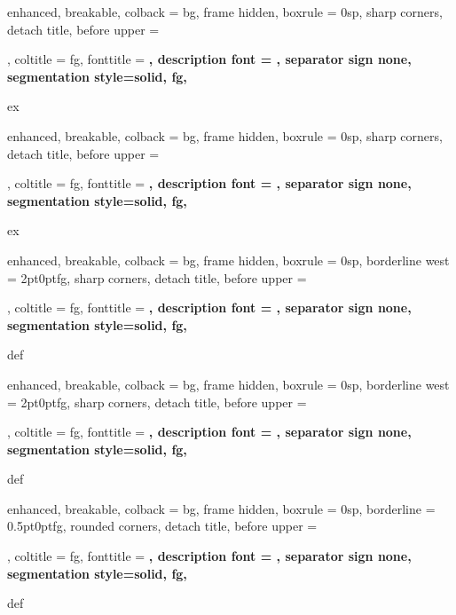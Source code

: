 {%
	enhanced,
	breakable,
	colback = bg,
	frame hidden,
	boxrule = 0sp,
	sharp corners,
	detach title,
	before upper = \tcbtitle\par\smallskip,
	coltitle = fg,
	fonttitle = \bfseries\sffamily,
	description font = \mdseries,
	separator sign none,
	segmentation style={solid, fg},
}
{ex}
{%
	enhanced,
	breakable,
	colback = bg,
	frame hidden,
	boxrule = 0sp,
	sharp corners,
	detach title,
	before upper = \tcbtitle\par\smallskip,
	coltitle = fg,
	fonttitle = \bfseries\sffamily,
	description font = \mdseries,
	separator sign none,
	segmentation style={solid, fg},
}
{ex}



{%
	enhanced,
	breakable,
	colback = bg,
	frame hidden,
	boxrule = 0sp,
	borderline west = {2pt}{0pt}{fg},
	sharp corners,
	detach title,
	before upper = \tcbtitle\par\smallskip,
	coltitle = fg,
	fonttitle = \bfseries\sffamily,
	description font = \mdseries,
	separator sign none,
	segmentation style={solid, fg},
}
{def}
{%
	enhanced,
	breakable,
	colback = bg,
	frame hidden,
	boxrule = 0sp,
	borderline west = {2pt}{0pt}{fg},
	sharp corners,
	detach title,
	before upper = \tcbtitle\par\smallskip,
	coltitle = fg,
	fonttitle = \bfseries\sffamily,
	description font = \mdseries,
	separator sign none,
	segmentation style={solid, fg},
}
{def}


\makeatletter
{}
{%
	enhanced,
	breakable,
	colback = bg,
	frame hidden,
	boxrule = 0sp,
	borderline = {0.5pt}{0pt}{fg},
	rounded corners,
	detach title,
	before upper = \tcbtitle\par\smallskip,
	coltitle = fg,
	fonttitle = \bfseries\sffamily,
	description font = \mdseries,
	separator sign none,
	segmentation style={solid, fg},
}
{def}
\makeatother


